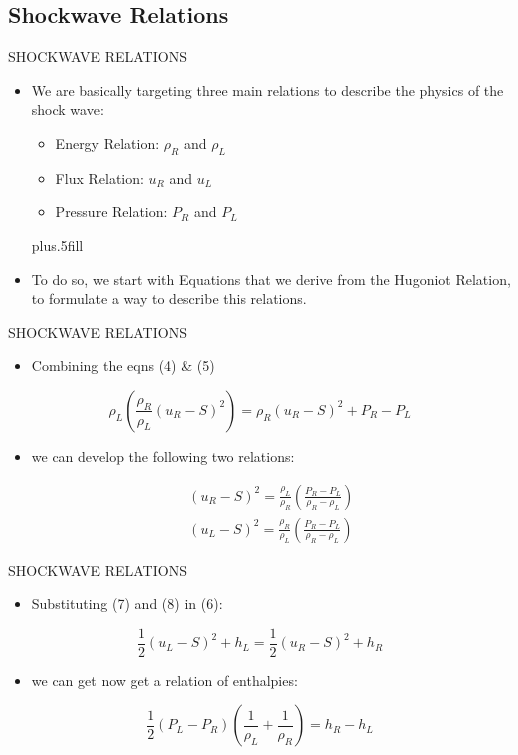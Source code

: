 \documentclass{beamer}
\begin{document}
\subsection{Shockwave Relations}

\begin{frame}{SHOCKWAVE RELATIONS}
  \begin{itemize}
   \item We are basically targeting three main relations to describe the physics of the shock wave:
      \begin{itemize}
	\item Energy Relation:  $\rho_R$ and $\rho_L$
	\item Flux Relation:  $u_R$ and $u_L$
	\item Pressure Relation:  $P_R$ and $P_L$
      \end{itemize}
    \vskip0pt plus.5fill
    \item To do so, we start with Equations that we derive from the Hugoniot Relation, to formulate a way to describe this relations.
  \end{itemize}  
\end{frame}

\begin{frame}{SHOCKWAVE RELATIONS}
  \begin{itemize}
   \item Combining the eqns \alert{(4)} \& \alert{(5)}
  \end{itemize}  
  \begin{equation}
   \rho_L\left(\frac{\rho_R}{\rho_L}(u_R-S)^2\right)=\rho_R(u_R-S)^2 +P_R-P_L \nonumber
  \end{equation}
  \begin{itemize}
   \item we can develop the following two relations:
  \end{itemize}
  \begin{eqnarray}
   &&(u_R-S)^2=\frac{\rho_L}{\rho_R}\left ( \frac{P_R-P_L}{\rho_R-\rho_L} \right ) \\
   &&(u_L-S)^2=\frac{\rho_R}{\rho_L}\left ( \frac{P_R-P_L}{\rho_R-\rho_L} \right )
  \end{eqnarray}
\end{frame}

\begin{frame}{SHOCKWAVE RELATIONS}
  \begin{itemize}
   \item Substituting \alert{(7)} and \alert{(8)} in \alert{(6)}:
  \end{itemize}  
  \begin{equation}
   \frac{1}{2}(u_L-S)^2+h_L=\frac{1}{2}(u_R-S)^2+h_R \nonumber
  \end{equation}
  \begin{itemize}
   \item we can get now get a relation of enthalpies:
  \end{itemize}
  \begin{equation}
   \frac{1}{2}\left(P_L-P_R\right)\left(\frac{1}{\rho_L}+\frac{1}{\rho_R}\right)=h_R-h_L
  \end{equation}
\end{frame}
\end{document}
